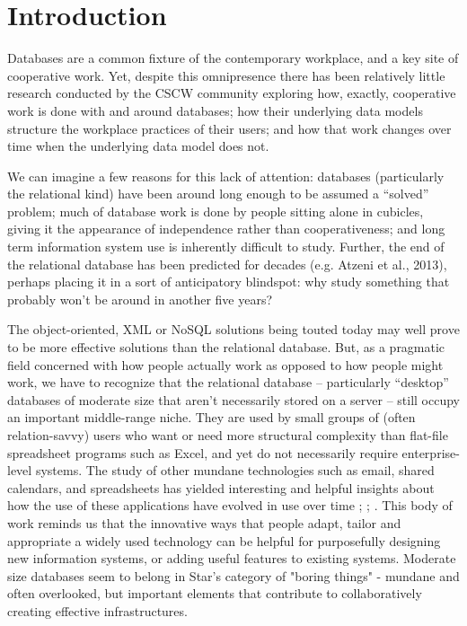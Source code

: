 \section{Introduction}

Databases are a common fixture of the contemporary workplace, and a key site of cooperative work. Yet, despite this omnipresence there has been relatively little research conducted by the CSCW community exploring how, exactly, cooperative work is done with and around databases;  how their underlying data models structure the workplace practices of their users; and how that work changes over time when the underlying data model does not. 

We can imagine a few reasons for this lack of attention: databases (particularly the relational kind) have been around long enough to be assumed a “solved” problem; much of database work is done by people sitting alone in cubicles, giving it the appearance of independence rather than cooperativeness; and long term information system use is inherently difficult to study. Further, the end of the relational database has been predicted for decades (e.g. Atzeni et al., 2013), perhaps placing it in a sort of anticipatory blindspot: why study something that probably won’t be around in another five years? 

The object-oriented, XML or NoSQL solutions being touted today may well prove to be more effective solutions than the relational database. But, as a pragmatic field concerned with how people actually work as opposed to how people might work, we have to recognize that the relational database – particularly “desktop” databases of moderate size that aren’t necessarily stored on a server – still occupy an important middle-range niche. They are used by small groups of (often relation-savvy) users who want or need more structural complexity than flat-file spreadsheet programs such as Excel, and yet do not necessarily require enterprise-level systems. The study of other mundane technologies such as email, shared calendars, and spreadsheets has yielded interesting and helpful insights about how the use of these applications have evolved in use over time  \cite{bellotti2005quality}; \cite{palen1999social};  \cite{nardi1991twinkling}. This body of work reminds us that the innovative ways that people adapt, tailor and appropriate a widely used technology can be helpful for purposefully designing new information systems, or adding useful features to existing systems. Moderate size databases seem to  belong in Star's category of "boring things" \cite{star1999ethnography} -  mundane and often overlooked, but important elements that contribute to collaboratively creating effective infrastructures.  

